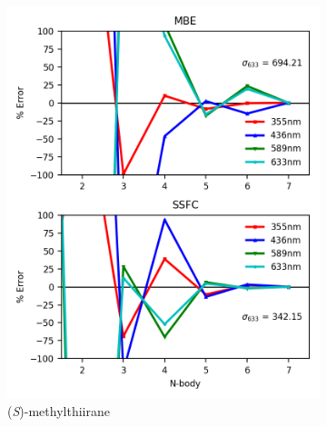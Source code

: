 \begin{figure}
\begin{subfigure}{0.5\textwidth}
                \includegraphics[scale=0.75]{p1/graphs/metthi_6_b3_rot.png}
                \caption{(\textit{S})-methylthiirane}
                \label{metthi_6_rot}
            \end{subfigure}
            \begin{subfigure}{0.5\textwidth}
                \centering

\end{subfigure}
\end{figure}
